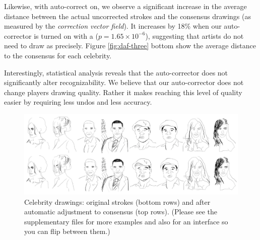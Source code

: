 Likewise, with auto-correct on,  we observe a significant increase in the average distance between the actual uncorrected strokes and the consensus drawings (as measured by the \emph{correction vector field}). It increases by 18\% when our auto-corrector is turned on with a ($p=1.65\times10^{-6}$), suggesting that artists do not need to draw as precisely. Figure \ref{fig:daf-three} bottom show the average distance to the consensus for each celebrity.

Interestingly, statistical analysis reveals that the auto-corrector does not significantly alter recognizability. We believe that our auto-corrector does not change players drawing quality. Rather it makes reaching this level of quality easier by requiring less undos and less accuracy.



\begin{figure}[!t]
  \centering%
\includegraphics[width=7in]{./figures/ResultsAll_16.png}
\vspace{-0.35in}
  \caption{Celebrity drawings: original strokes (bottom rows) and after automatic adjustment to consensus (top rows). (Please see the supplementary files for more examples and also for an interface so you can flip between them.)}
\vspace{-0.25in}
  \label{fig:results}
\end{figure}
